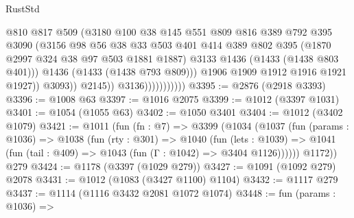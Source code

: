 \begin{lexlean}{RustStd}
\begin{coremodule}
                                      @810
                                      @817
                                      @509
                                      (@3180
                                        @100
                                        @38
                                        @145
                                        @551
                                        @809
                                        @816
                                        @389
                                        @792
                                        @395
                                        @3090
                                        (@3156
                                          @98
                                          @56
                                          @38
                                          @33
                                          @503
                                          @401
                                          @414
                                          @389
                                          @802
                                          @395
                                          (@1870 @2997 @324 @38 @97 @503 @1881 @1887)
                                          @3133
                                          @1436
                                          (@1433 (@1438 @803 @401)))
                                        @1436
                                        (@1433 (@1438 @793 @809)))
                                      @1906
                                      @1909
                                      @1912
                                      @1916
                                      @1921
                                      @1927))
                                  @3093))
                              @2145))
                          @3136)))))))))))
@3395 := @2876 (@2918 @3393)
@3396 := @1008 @63
@3397 := @1016 @2075
@3399 := @1012 (@3397 @1031)
@3401 := @1054 (@1055 @63)
@3402 := @1050 @3401
@3404 := @1012 (@3402 @1079)
@3421 := @1011
    (fun (fn : @7) =>
    @3399
      (@1034
        (@1037
          (fun (params : @1036) =>
          @1038
            (fun (rty : @301) =>
            @1040
              (fun (lets : @1039) =>
              @1041 (fun (tail : @409) => @1043 (fun (Γ : @1042) => @3404 @1126))))))
        @1172))
    @279
@3424 := @1178 (@3397 (@1029 @279))
@3427 := @1091 (@1092 @279) @2078
@3431 := @1012 (@1083 (@3427 @1100) @1104)
@3432 := @1117 @279
@3437 := @1114 (@1116 @3432 @2081 @1072 @1074)
@3448 := fun (params : @1036) =>

\end{coremodule}
\end{lexlean}
